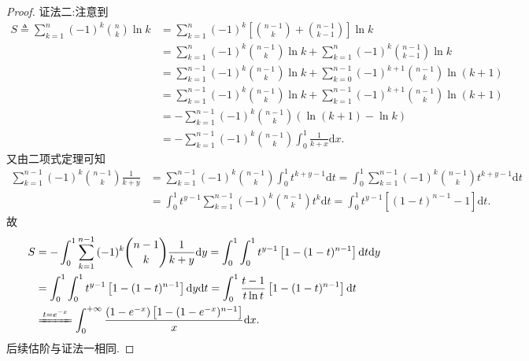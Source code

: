 \documentclass[../../main.tex]{subfiles}%
\begin{document}
\begin{proof}
{\color{blue}证法二:}注意到
\begin{align*}
S\triangleq \sum\limits_{k=1}^n{(-1) ^k\binom{n}{k}\ln k}&=\sum\limits_{k=1}^n{(-1) ^k\left[\binom{n-1}{k}+\binom{n-1}{k-1}\right]\ln k}
\\
&=\sum\limits_{k=1}^n{(-1) ^k\binom{n-1}{k}\ln k}+\sum\limits_{k=1}^n{(-1) ^k\binom{n-1}{k-1}\ln k}
\\
&=\sum\limits_{k=1}^{n-1}{(-1) ^k\binom{n-1}{k}\ln k}+\sum\limits_{k=0}^{n-1}{(-1) ^{k+1}\binom{n-1}{k}\ln (k+1)}
\\
&=\sum\limits_{k=1}^{n-1}{(-1) ^k\binom{n-1}{k}\ln k}+\sum\limits_{k=1}^{n-1}{(-1) ^{k+1}\binom{n-1}{k}\ln (k+1)}
\\
&=-\sum\limits_{k=1}^{n-1}{(-1) ^k\binom{n-1}{k}\left(\ln (k+1)-\ln k\right)}
\\
&=-\sum\limits_{k=1}^{n-1}{(-1) ^k\binom{n-1}{k}\int_0^1{\frac{1}{k+x}\mathrm{d}x}}.
\end{align*}
又由二项式定理可知
\begin{align*}
\sum\limits_{k=1}^{n-1}{(-1) ^k\binom{n-1}{k}\frac{1}{k+y}}&=\sum\limits_{k=1}^{n-1}{(-1) ^k\binom{n-1}{k}\int_0^1{t^{k+y-1}\mathrm{d}t}}=\int_0^1{\sum\limits_{k=1}^{n-1}{(-1) ^k\binom{n-1}{k}}t^{k+y-1}\mathrm{d}t}
\\
&=\int_0^1{t^{y-1}\sum\limits_{k=1}^{n-1}{(-1) ^k\binom{n-1}{k}}t^k\mathrm{d}t}=\int_0^1{t^{y-1}\left[(1-t) ^{n-1}-1\right] \mathrm{d}t}.
\end{align*}
故
\begin{align*}
S&=-\int_0^1{\sum\limits_{k=1}^{n-1}{(-1) ^k\binom{n-1}{k}\frac{1}{k+y}}\mathrm{d}y}=\int_0^1{\int_0^1{t^{y-1}\left[1-(1-t) ^{n-1}\right] \mathrm{d}t}\mathrm{d}y}
\\
&=\int_0^1{\int_0^1{t^{y-1}\left[1-(1-t) ^{n-1}\right] \mathrm{d}y}\mathrm{d}t}=\int_0^1{\frac{t-1}{t\ln t}\left[1-(1-t) ^{n-1}\right] \mathrm{d}t}
\\
&\xlongequal{t=e^{-x}}\int_0^{+\infty}{\frac{(1-e^{-x})\left[ 1-(1-e^{-x})^{n-1} \right]}{x}\mathrm{d}x}.
\end{align*}
后续估阶与证法一相同.


\end{proof}
\end{document}
